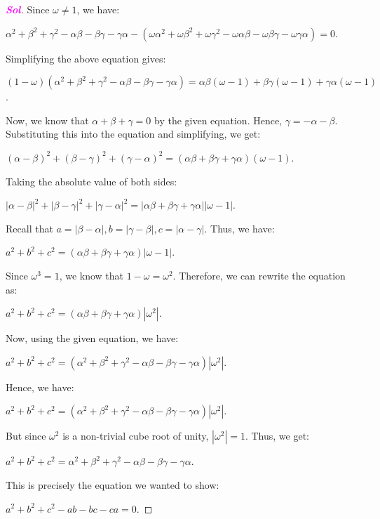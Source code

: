 \documentclass{article}
\theoremstyle{definition}
\newcommand{\sol}{\textcolor{magenta}{\bf Sol}}
\begin{document}
\begin{enumerate}
\begin{proof}[\sol]
	Since $\omega \neq 1$, we have:
	
	$\alpha^2 + \beta^2 + \gamma^2 - \alpha\beta - \beta\gamma - \gamma\alpha - (\omega\alpha^2 + \omega\beta^2 + \omega\gamma^2 - \omega\alpha\beta - \omega\beta\gamma - \omega\gamma\alpha) = 0$.
	
	Simplifying the above equation gives:
	
	$(1-\omega)(\alpha^2 + \beta^2 + \gamma^2 - \alpha\beta - \beta\gamma - \gamma\alpha) = \alpha\beta(\omega - 1) + \beta\gamma(\omega - 1) + \gamma\alpha(\omega - 1)$.
	
	Now, we know that $\alpha + \beta + \gamma = 0$ by the given equation. Hence, $\gamma = -\alpha - \beta$. Substituting this into the equation and simplifying, we get:
	
	$(\alpha - \beta)^2 + (\beta - \gamma)^2 + (\gamma - \alpha)^2 = (\alpha\beta + \beta\gamma + \gamma\alpha)(\omega - 1)$.
	
	Taking the absolute value of both sides:
	
	$|\alpha - \beta|^2 + |\beta - \gamma|^2 + |\gamma - \alpha|^2 = |\alpha\beta + \beta\gamma + \gamma\alpha||\omega - 1|$.
	
	Recall that $a = |\beta - \alpha|, b = |\gamma - \beta|, c = |\alpha - \gamma|$. Thus, we have:
	
	$a^2 + b^2 + c^2 = (\alpha\beta + \beta\gamma + \gamma\alpha)|\omega - 1|$.
	
	Since $\omega^3 = 1$, we know that $1 - \omega = \omega^2$. Therefore, we can rewrite the equation as:
	
	$a^2 + b^2 + c^2 = (\alpha\beta + \beta\gamma + \gamma\alpha)|\omega^2|$.
	
	Now, using the given equation, we have:
	
	$a^2 + b^2 + c^2 = (\alpha^2 + \beta^2 + \gamma^2 - \alpha\beta - \beta\gamma - \gamma\alpha)|\omega^2|$.
	
	Hence, we have:
	
	$a^2 + b^2 + c^2 = (\alpha^2 + \beta^2 + \gamma^2 - \alpha\beta - \beta\gamma - \gamma\alpha)|\omega^2|$.
	
	But since $\omega^2$ is a non-trivial cube root of unity, $|\omega^2| = 1$. Thus, we get:
	
	$a^2 + b^2 + c^2 = \alpha^2 + \beta^2 + \gamma^2 - \alpha\beta - \beta\gamma - \gamma\alpha$.
	
	This is precisely the equation we wanted to show:
	
	$a^2 + b^2 + c^2 - ab - bc - ca = 0$.
	

\end{proof}
\end{enumerate}
\end{document}
